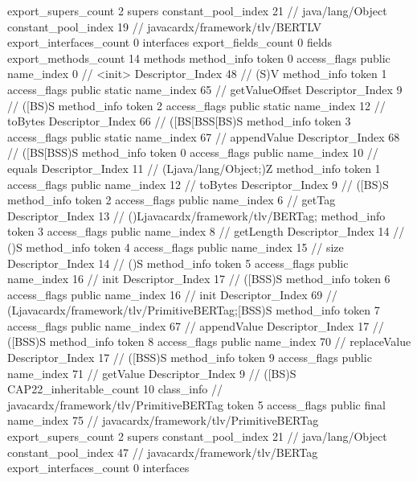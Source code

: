 {{{			export_supers_count	2
			supers {
				constant_pool_index	21		// java/lang/Object
				constant_pool_index	19		// javacardx/framework/tlv/BERTLV
			}
			export_interfaces_count	0
			interfaces {
			}
			export_fields_count	0
			fields {
			}
			export_methods_count	14
			methods {
				method_info {
					token	0
					access_flags	public
					name_index	0		// <init>
					Descriptor_Index	48		// (S)V
				}
				method_info {
					token	1
					access_flags	public static
					name_index	65		// getValueOffset
					Descriptor_Index	9		// ([BS)S
				}
				method_info {
					token	2
					access_flags	public static
					name_index	12		// toBytes
					Descriptor_Index	66		// ([BS[BSS[BS)S
				}
				method_info {
					token	3
					access_flags	public static
					name_index	67		// appendValue
					Descriptor_Index	68		// ([BS[BSS)S
				}
				method_info {
					token	0
					access_flags	public
					name_index	10		// equals
					Descriptor_Index	11		// (Ljava/lang/Object;)Z
				}
				method_info {
					token	1
					access_flags	public
					name_index	12		// toBytes
					Descriptor_Index	9		// ([BS)S
				}
				method_info {
					token	2
					access_flags	public
					name_index	6		// getTag
					Descriptor_Index	13		// ()Ljavacardx/framework/tlv/BERTag;
				}
				method_info {
					token	3
					access_flags	public
					name_index	8		// getLength
					Descriptor_Index	14		// ()S
				}
				method_info {
					token	4
					access_flags	public
					name_index	15		// size
					Descriptor_Index	14		// ()S
				}
				method_info {
					token	5
					access_flags	public
					name_index	16		// init
					Descriptor_Index	17		// ([BSS)S
				}
				method_info {
					token	6
					access_flags	public
					name_index	16		// init
					Descriptor_Index	69		// (Ljavacardx/framework/tlv/PrimitiveBERTag;[BSS)S
				}
				method_info {
					token	7
					access_flags	public
					name_index	67		// appendValue
					Descriptor_Index	17		// ([BSS)S
				}
				method_info {
					token	8
					access_flags	public
					name_index	70		// replaceValue
					Descriptor_Index	17		// ([BSS)S
				}
				method_info {
					token	9
					access_flags	public
					name_index	71		// getValue
					Descriptor_Index	9		// ([BS)S
				}
			}
			CAP22_inheritable_count	10
		}
		class_info {		// javacardx/framework/tlv/PrimitiveBERTag
			token	5
			access_flags	public final
			name_index	75		// javacardx/framework/tlv/PrimitiveBERTag
			export_supers_count	2
			supers {
				constant_pool_index	21		// java/lang/Object
				constant_pool_index	47		// javacardx/framework/tlv/BERTag
			}
			export_interfaces_count	0
			interfaces {
}}}}
